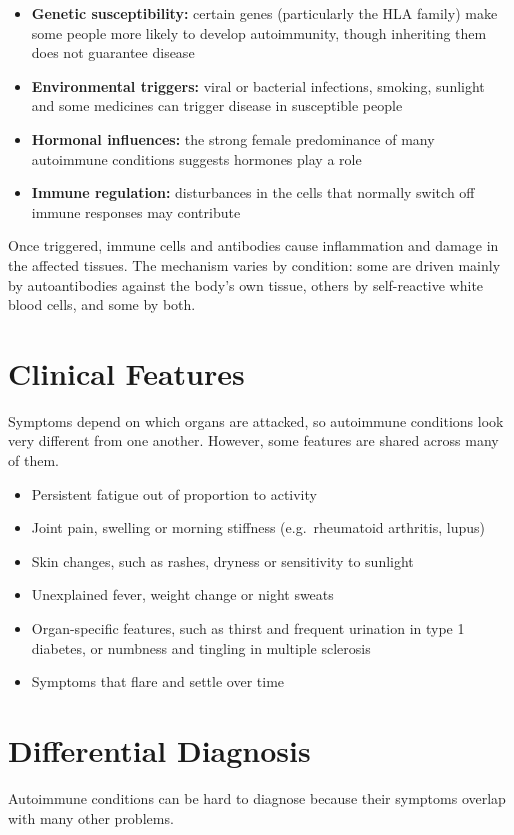 \begin{itemize}
    \item \textbf{Genetic susceptibility:} certain genes (particularly the HLA family) make some people more likely to develop autoimmunity, though inheriting them does not guarantee disease
    \item \textbf{Environmental triggers:} viral or bacterial infections, smoking, sunlight and some medicines can trigger disease in susceptible people
    \item \textbf{Hormonal influences:} the strong female predominance of many autoimmune conditions suggests hormones play a role
    \item \textbf{Immune regulation:} disturbances in the cells that normally switch off immune responses may contribute
\end{itemize}

Once triggered, immune cells and antibodies cause inflammation and damage in the affected tissues. The mechanism varies by condition: some are driven mainly by autoantibodies against the body's own tissue, others by self-reactive white blood cells, and some by both.

\section*{Clinical Features}
Symptoms depend on which organs are attacked, so autoimmune conditions look very different from one another. However, some features are shared across many of them.

\begin{itemize}
    \item Persistent fatigue out of proportion to activity
    \item Joint pain, swelling or morning stiffness (e.g.\ rheumatoid arthritis, lupus)
    \item Skin changes, such as rashes, dryness or sensitivity to sunlight
    \item Unexplained fever, weight change or night sweats
    \item Organ-specific features, such as thirst and frequent urination in type 1 diabetes, or numbness and tingling in multiple sclerosis
    \item Symptoms that flare and settle over time
\end{itemize}

\section*{Differential Diagnosis}
Autoimmune conditions can be hard to diagnose because their symptoms overlap with many other problems.

